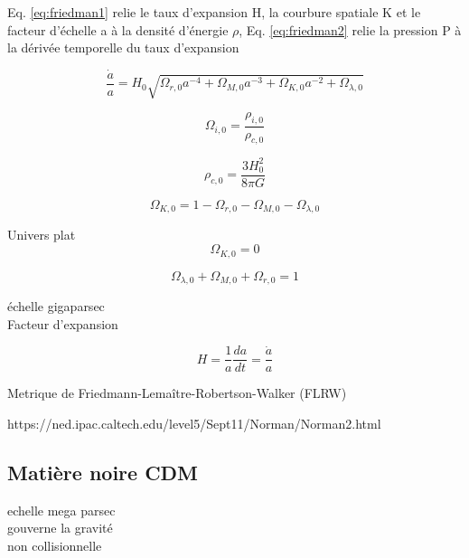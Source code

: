 Eq. \ref{eq:friedman1} relie le taux d'expansion H, la courbure spatiale K et le facteur d'échelle a à la densité d'énergie $\rho$, 
Eq. \ref{eq:friedman2} relie la pression P à la dérivée temporelle du taux d'expansion
 
 
 
\begin{equation}
\frac{\dot{a}}{a} = H_0 \sqrt{ \Omega_{r,0} a^{-4} +  \Omega_{M,0} a^{-3} + \Omega_{K,0}a^{-2} + \Omega_{\lambda,0}  } 
\end{equation}


\begin{equation}
 \Omega_{i,0} = \frac{\rho_{i,0}}{\rho_{c,0}}
 \end{equation}

\begin{equation}
\rho_{c,0} = \frac{3H_0^2}{8\pi G}
 \end{equation}
 
 
\begin{equation}
 \Omega_{K,0} = 1 - \Omega_{r,0} - \Omega_{M,0} - \Omega_{\lambda,0} 
 \end{equation}

Univers plat
\begin{equation}
 \Omega_{K,0} = 0
 \end{equation}

\begin{equation}
\Omega_{\lambda,0} +  \Omega_{M,0} + \Omega_{r,0} =1
 \end{equation}




échelle gigaparsec\\
Facteur d'expansion


\begin{equation}
H=\frac{1}{a} \frac{da}{dt} = \frac{\dot{a}}{a}
\end{equation}

Metrique de Friedmann-Lemaître-Robertson-Walker (FLRW)


https://ned.ipac.caltech.edu/level5/Sept11/Norman/Norman2.html

\subsection{Matière noire CDM}

echelle mega parsec\\
gouverne la gravité\\
non collisionnelle\\


